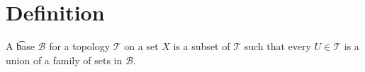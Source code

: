 

\section*{Definition}

A \t{base} $\mathcal{B} $ for a topology $\mathcal{T} $ on a set $X$ is a subset of $\mathcal{T} $ such that every $U \in \mathcal{T} $ is a union of a family of sets in $\mathcal{B} $.

\blankpage